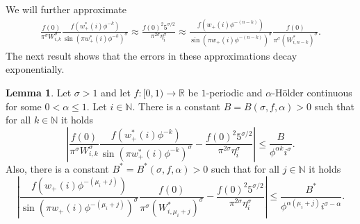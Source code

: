 \documentclass[]{interact}
\newcommand{\bbN}{\mathbb{N}}
\newcommand{\bbR}{\mathbb{R}}
\theoremstyle{definition}
\newtheorem{lem}[thm]{Lemma}
\numberwithin{table}{section} %
\numberwithin{figure}{section}
\begin{document}
We will further approximate
\begin{align*}
    \frac{f(0)}{\pi^\sigma W_{i, k}^\sigma} \frac{f(w_+^*(i) \phi^{-k})}{{\sin(\pi w_+^*(i) \phi^{-k})}^\sigma}
    \approx \frac{f(0)^2 5^{\sigma/2}}{\pi^{2\sigma} \eta_i^\sigma}
    \approx \frac{f(w_+(i) \phi^{-(n-k)})}{{\sin(\pi w_+(i) \phi^{-(n-k)})}^\sigma} \frac{f(0)}{\pi^\sigma (W_{i, n-k}^*)^\sigma}.
\end{align*}
The next result shows that the errors in these approximations decay exponentially.

\begin{lem} \label{lem:exp_decay}
    Let $\sigma > 1$ and let $f:[0, 1) \rightarrow \bbR$ be $1$-periodic and $\alpha$-Hölder continuous for some $0<\alpha\leq 1$. Let $i \in \bbN$. There is a constant $B = B(\sigma, f, \alpha) > 0$ such that for all $k \in \bbN$ it holds
    $$
    \left|\frac{f(0)}{\pi^\sigma W_{i, k}^\sigma} \frac{f(w_+^*(i) \phi^{-k})}{{\sin(\pi w_+^*(i) \phi^{-k})}^\sigma} - \frac{f(0)^2 5^{\sigma/2}}{\pi^{2\sigma} \eta_i^\sigma}\right| \leq \frac{B}{\phi^{\alpha k} i^\sigma}.
    $$
    Also, there is a constant $B^* = B^*(\sigma, f, \alpha) > 0$ such that for all $j \in \bbN$ it holds%
    $$
    \left|\frac{f(w_+(i) \phi^{-(\mu_i+j)})}{{\sin(\pi w_+(i) \phi^{-(\mu_i+j)})}^\sigma} \frac{f(0)}{\pi^\sigma (W_{i, \mu_i+j}^*)^\sigma} - \frac{f(0)^2 5^{\sigma/2}}{\pi^{2\sigma} \eta_i^\sigma}\right| \leq \frac{B^*}{\phi^{\alpha (\mu_i+j)} i^{\sigma-\alpha}}.
    $$
\end{lem}
\end{document}
